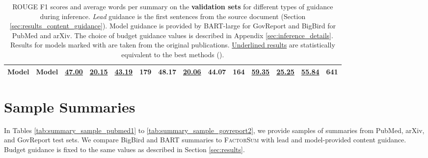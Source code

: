 \documentclass[11pt,table]{article}
\newcommand{\modelname}{FactorSum}
\begin{document}
\begin{table*}[h]
\begin{tabular}{lc|cccc|cccc|cccc}
    Model & Model & \underline{47.00} & \underline{20.15} & \underline{43.19} & 179 & 48.17 & \underline{20.06} & 44.07 & 164 & \underline{59.35} & \underline{25.25} & \underline{55.84} & 641 \\
    \bottomrule
  \end{tabular}
  \caption{ROUGE F1 scores and average words per summary on the \textbf{validation sets} for different types of guidance during inference. \emph{Lead} guidance is the first  sentences from the source document (Section \ref{sec:results_content_guidance}). Model guidance is provided by BART-large for GovReport and BigBird for PubMed and arXiv. The choice of budget guidance values is described in Appendix \ref{sec:inference_details}. Results for models marked with  are taken from the original publications. \underline{Underlined results} are statistically  equivalent to the best methods ().}\label{tab:experiment_results_validation}
\end{table*}


\section{Sample Summaries}
\label{sec:sample_summaries}
In Tables \ref{tab:summary_sample_pubmed1} to \ref{tab:summary_sample_govreport2}, we provide samples of summaries from PubMed, arXiv, and GovReport test sets. We compare BigBird and BART summaries to \textsc{\modelname} with lead and model-provided content guidance. Budget guidance is fixed to the same values as described in Section \ref{sec:results}.
\end{document}
